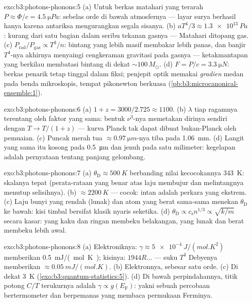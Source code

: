 \begin{solution}{exo:b3:photons-phonons:5}
(a) Untuk berkas matahari yang terarah $P \approx \Phi/c =
\qty{4.5}{\micro Pa}$: sebelas orde di bawah atmosfernya ---
layar surya berhasil hanya karena antariksa mengurangkan segala
sisanya. (b)
$aT^4/3 \approx \qty{1.3e13}{Pa}$: kurang dari satu bagian dalam
seribu tekanan gasnya --- Matahari ditopang gas. (c)
$P_{\text{rad}}/P_{\text{gas}} \propto T^3/n$: bintang yang lebih masif
membakar lebih panas, dan banjir $T^4$-nya akhirnya menyaingi cengkeraman
gravitasi pada gasnya --- ketakmantapan yang berkilau membatasi bintang
di dekat
$\sim100\,M_\odot$. (d) $F = P/c = \qty{3.3}{\micro N}$:
berkas penarik tetap tinggal dalam fiksi; penjepit optik memakai
\emph{gradien} medan pada benda mikroskopis, tempat pikonewton berkuasa
(\cref{pb:b3:microcanonical-ensemble:1}).
\end{solution}

\begin{solution}{exo:b3:photons-phonons:6}
(a) $1 + z = 3000/2.725 \approx 1100$. (b) $\lambda$ tiap ragamnya
terentang oleh faktor yang sama: bentuk $\nu^3$-nya memetakan dirinya
sendiri dengan $T \to T/(1+z)$ --- kurva Planck tak dapat dibuat
bukan-Planck oleh pemuaian. (c) Puncak merah tua $\approx\qty{0.97}{\micro m}$-nya
tiba pada \qty{1.06}{mm}. (d) Langit yang sama itu kosong pada
\qty{0.5}{\micro m} dan jenuh pada satu milimeter: kegelapan adalah
pernyataan tentang panjang gelombang.
\end{solution}

\begin{solution}{exo:b3:photons-phonons:7}
(a) $\theta_{\text{D}} \approx \qty{500}{K}$ berbanding nilai
kecocokannya \qty{343}{K}: skalanya tepat (perata-rataan yang benar atas
laju membujur dan melintangnya menutup selisihnya). (b) $\approx\qty{2200}{K}$ ---
cocok: intan adalah perkara yang ekstrem. (c) Laju bunyi yang rendah (lunak)
dan atom yang berat sama-sama menekan $\theta_{\text{D}}$ ke bawah: kisi
timbal bersifat klasik nyaris seketika. (d) $\theta_{\text{D}} \propto
c_{\text{s}}n^{1/3} \propto \sqrt{k/m}$ secara kasar: yang kaku dan ringan
membeku belakangan, yang lunak dan berat membeku lebih awal.
\end{solution}

\begin{solution}{exo:b3:photons-phonons:8}
(a) Elektroniknya: $\gamma \approx \qty{5e-4}{J/(mol.K^2)}$ memberikan
\qty{0.5}{mJ/(mol.K)}; kisinya: $1944R\dots$ --- suku $T^3$ Debyenya
memberikan $\approx\qty{0.05}{mJ/(mol.K)}$. (b) Elektronnya, sebesar
satu orde. (c) Di dekat \qty{3}{K}
(\cref{exo:b3:quantum-statistics:5}). (d) Di bawah perpindahannya,
titik potong $C/T$ terukurnya adalah $\gamma \propto g(E_{\text{F}})$: yakni
sebuah percobaan bertermometer dan berpemanas yang membaca  permukaan Ferminya.
\end{solution}

